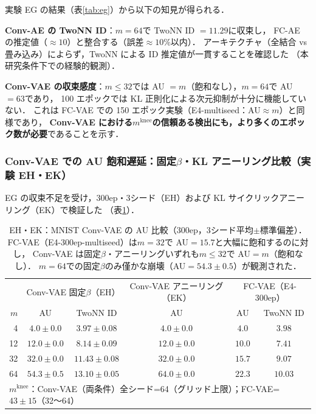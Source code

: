 \documentclass[11pt,a4paper]{jsarticle}
\newcommand{\mknee}{m^{\mathrm{knee}}}
\begin{document}
実験 EG の結果（表\ref{tab:eg}）から以下の知見が得られる．

\textbf{Conv-AE の TwoNN ID}：$m = 64$で TwoNN ID $= 11.29$に収束し，
FC-AE の推定値（$\approx 10$）と整合する（誤差$\approx 10\%$以内）．
アーキテクチャ（全結合 vs 畳み込み）によらず，TwoNN による ID 推定値が一貫することを確認した
（本研究条件下での経験的観測）．

\textbf{Conv-VAE の収束感度}：$m \leq 32$では AU $= m$（飽和なし），$m = 64$で AU $= 63$であり，
100 エポックでは KL 正則化による次元抑制が十分に機能していない．
これは FC-VAE での 150 エポック実験（E4-multiseed：AU$\approx m$）と同様であり，
\textbf{Conv-VAE における$\mknee$の信頼ある検出にも，より多くのエポック数が必要}であることを示す．

\subsubsection{Conv-VAE での AU 飽和遅延：固定$\beta$・KL アニーリング比較（実験 EH・EK）}
\label{sec:exp_conv_300ep}

EG の収束不足を受け，300ep・3シード（EH）および KL サイクリックアニーリング（EK）で検証した
（表\ref{tab:eh_conv_vae}）．

\begin{table}[H]
\centering
\caption{EH・EK：MNIST Conv-VAE の AU 比較（300ep，3シード平均$\pm$標準偏差）．
FC-VAE（E4-300ep-multiseed）は$m=32$で AU$=15.7$と大幅に飽和するのに対し，
Conv-VAE は固定$\beta$・アニーリングいずれも$m \leq 32$で AU$=m$（飽和なし）．
$m=64$での固定$\beta$のみ僅かな崩壊（AU$=54.3\pm0.5$）が観測された．}
\label{tab:eh_conv_vae}
\small
\begin{tabular}{r ccc cc}
\toprule
 & \multicolumn{2}{c}{Conv-VAE 固定$\beta$（EH）} & \multicolumn{1}{c}{Conv-VAE アニーリング（EK）} & \multicolumn{2}{c}{FC-VAE（E4-300ep）} \\
$m$ & AU & TwoNN ID & AU & AU & TwoNN ID \\
\midrule
 4 & $4.0\pm0.0$ & $3.97\pm0.08$ & $4.0\pm0.0$ & $4.0$ & $3.98$ \\
12 & $12.0\pm0.0$ & $8.14\pm0.09$ & $12.0\pm0.0$ & $10.0$ & $7.41$ \\
32 & $32.0\pm0.0$ & $11.43\pm0.08$ & $32.0\pm0.0$ & $15.7$ & $9.07$ \\
64 & $54.3\pm0.5$ & $13.10\pm0.05$ & $64.0\pm0.0$ & $22.3$ & $10.03$ \\
\midrule
\multicolumn{6}{l}{$\mknee$：Conv-VAE（両条件）全シード=64（グリッド上限）；FC-VAE=$43\pm15$（32〜64）} \\
\bottomrule
\end{tabular}
\end{table}
\end{document}
